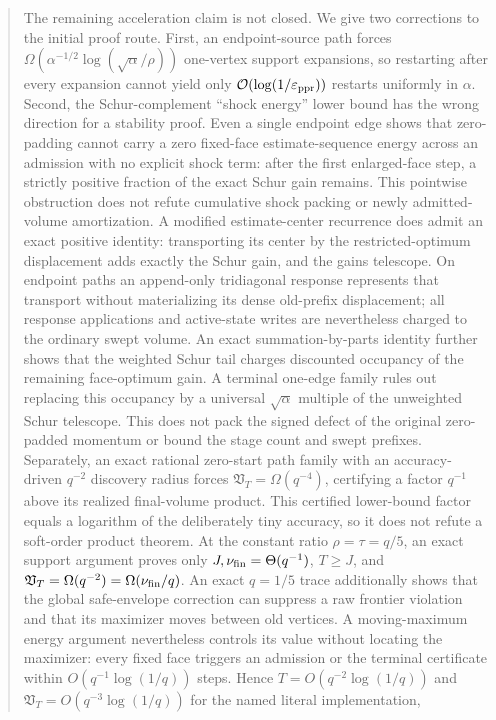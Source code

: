 \documentclass[11pt]{article}
\begin{document}
\begin{abstract}
The remaining acceleration claim is not closed.  We give two corrections to
the initial proof route.  First, an endpoint-source path forces
$\Omega(\alpha^{-1/2}\log(\sqrt\alpha/\rho))$ one-vertex support expansions,
so restarting after every expansion cannot yield only
$\bigO(\log(1/\epsppr))$ restarts uniformly in $\alpha$.  Second, the
Schur-complement ``shock energy'' lower bound has the wrong direction for a
stability proof.  Even a single endpoint edge shows that zero-padding cannot
carry a zero fixed-face estimate-sequence energy across an admission with no
explicit shock term: after the first enlarged-face step, a strictly positive
fraction of the exact Schur gain remains.  This pointwise obstruction does not
refute cumulative shock packing or newly admitted-volume amortization.  A
modified estimate-center recurrence does admit an exact positive identity:
transporting its center by the restricted-optimum displacement adds exactly
the Schur gain, and the gains telescope.  On endpoint paths an append-only
tridiagonal response represents that transport without materializing its
dense old-prefix displacement; all response applications and active-state
writes are nevertheless charged to the ordinary swept volume.  An exact
summation-by-parts identity further shows that the weighted Schur tail charges
discounted occupancy of the remaining face-optimum gain.  A terminal
one-edge family rules out replacing this occupancy by a universal
$\sqrt\alpha$ multiple of the unweighted Schur telescope.  This does not pack
the signed defect of the original zero-padded momentum or bound the stage
count and swept prefixes.  Separately, an exact rational zero-start path
family with an accuracy-driven $q^{-2}$ discovery radius forces
$\mathfrak V_T=\Omega(q^{-4})$, certifying a factor $q^{-1}$ above its
realized final-volume product.  This certified lower-bound factor equals a
logarithm of the deliberately tiny accuracy, so it does not refute a
soft-order product theorem.  At the constant ratio $\rho=\tau=q/5$, an exact
support argument proves only
$J,\nu_{\rm fin}=\Theta(q^{-1})$, $T\geq J$, and
$\mathfrak V_T=\Omega(q^{-2})=\Omega(\nu_{\rm fin}/q)$.  An exact $q=1/5$
trace additionally shows that the global safe-envelope correction can
suppress a raw frontier violation and that its maximizer moves between old
vertices.  A moving-maximum energy argument nevertheless controls its value
without locating the maximizer: every fixed face triggers an admission or the
terminal certificate within
$O(q^{-1}\log(1/q))$ steps.  Hence
$T=O(q^{-2}\log(1/q))$ and
$\mathfrak V_T=O(q^{-3}\log(1/q))$ for the named literal implementation,

\end{abstract}
\end{document}

